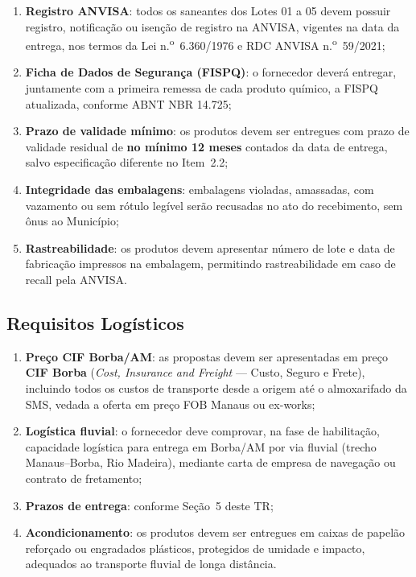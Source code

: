 \documentclass[12pt,a4paper]{article}
\begin{document}
\begin{enumerate}
  \item \textbf{Registro ANVISA}: todos os saneantes dos Lotes 01 a 05 devem possuir
    registro, notificação ou isenção de registro na ANVISA, vigentes na data da entrega,
    nos termos da Lei n.\textsuperscript{o}~6.360/1976 e RDC ANVISA
    n.\textsuperscript{o}~59/2021;

  \item \textbf{Ficha de Dados de Segurança (FISPQ)}: o fornecedor deverá entregar,
    juntamente com a primeira remessa de cada produto químico, a FISPQ atualizada,
    conforme ABNT NBR 14.725;

  \item \textbf{Prazo de validade mínimo}: os produtos devem ser entregues com prazo
    de validade residual de \textbf{no mínimo 12 meses} contados da data de entrega,
    salvo especificação diferente no Item~2.2;

  \item \textbf{Integridade das embalagens}: embalagens violadas, amassadas, com vazamento
    ou sem rótulo legível serão recusadas no ato do recebimento, sem ônus ao Município;

  \item \textbf{Rastreabilidade}: os produtos devem apresentar número de lote e data
    de fabricação impressos na embalagem, permitindo rastreabilidade em caso de recall
    pela ANVISA.
\end{enumerate}

\subsection{Requisitos Logísticos}

\begin{enumerate}
  \item \textbf{Preço CIF Borba/AM}: as propostas devem ser apresentadas em preço
    \textbf{CIF Borba} (\textit{Cost, Insurance and Freight} --- Custo, Seguro e Frete),
    incluindo todos os custos de transporte desde a origem até o almoxarifado da SMS,
    vedada a oferta em preço FOB Manaus ou ex-works;

  \item \textbf{Logística fluvial}: o fornecedor deve comprovar, na fase de habilitação,
    capacidade logística para entrega em Borba/AM por via fluvial (trecho Manaus--Borba,
    Rio Madeira), mediante carta de empresa de navegação ou contrato de fretamento;

  \item \textbf{Prazos de entrega}: conforme Seção~5 deste TR;

  \item \textbf{Acondicionamento}: os produtos devem ser entregues em caixas de papelão
    reforçado ou engradados plásticos, protegidos de umidade e impacto, adequados ao
    transporte fluvial de longa distância.
\end{enumerate}
\end{document}
